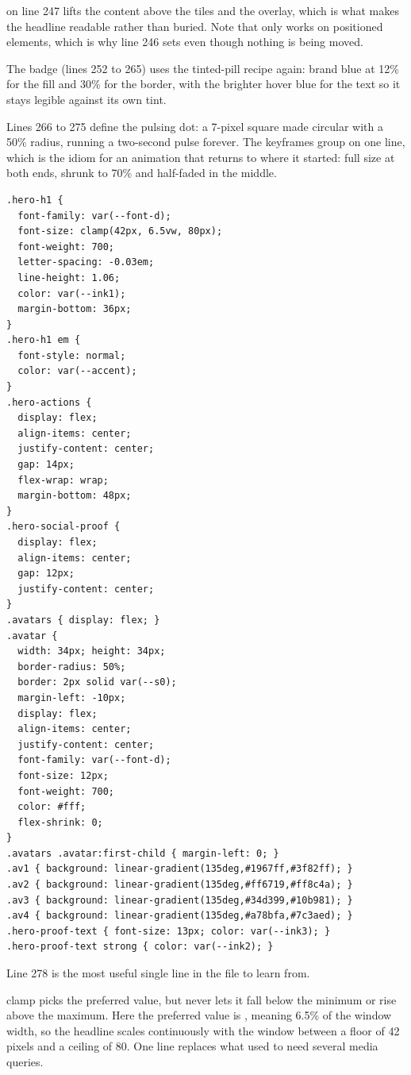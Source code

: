 on line 247 lifts the content above the tiles and the overlay,
which is what makes the headline readable rather than buried. Note that
 only works on positioned elements, which is why line 246 sets
 even though nothing is being moved.

The badge (lines 252 to 265) uses the tinted-pill recipe again: brand blue at 12\%
for the fill and 30\% for the border, with the brighter hover blue for the text so
it stays legible against its own tint.

Lines 266 to 275 define the pulsing dot: a 7-pixel square made circular with a 50\%
radius, running a two-second pulse forever. The keyframes group 
on one line, which is the idiom for an animation that returns to where it started:
full size at both ends, shrunk to 70\% and half-faded in the middle.

\begin{lstlisting}[firstnumber=276,caption={\file{css/site.css}, lines 276--324}]
.hero-h1 {
  font-family: var(--font-d);
  font-size: clamp(42px, 6.5vw, 80px);
  font-weight: 700;
  letter-spacing: -0.03em;
  line-height: 1.06;
  color: var(--ink1);
  margin-bottom: 36px;
}
.hero-h1 em {
  font-style: normal;
  color: var(--accent);
}
.hero-actions {
  display: flex;
  align-items: center;
  justify-content: center;
  gap: 14px;
  flex-wrap: wrap;
  margin-bottom: 48px;
}
.hero-social-proof {
  display: flex;
  align-items: center;
  gap: 12px;
  justify-content: center;
}
.avatars { display: flex; }
.avatar {
  width: 34px; height: 34px;
  border-radius: 50%;
  border: 2px solid var(--s0);
  margin-left: -10px;
  display: flex;
  align-items: center;
  justify-content: center;
  font-family: var(--font-d);
  font-size: 12px;
  font-weight: 700;
  color: #fff;
  flex-shrink: 0;
}
.avatars .avatar:first-child { margin-left: 0; }
.av1 { background: linear-gradient(135deg,#1967ff,#3f82ff); }
.av2 { background: linear-gradient(135deg,#ff6719,#ff8c4a); }
.av3 { background: linear-gradient(135deg,#34d399,#10b981); }
.av4 { background: linear-gradient(135deg,#a78bfa,#7c3aed); }
.hero-proof-text { font-size: 13px; color: var(--ink3); }
.hero-proof-text strong { color: var(--ink2); }
\end{lstlisting}

Line 278 is the most useful single line in the file to learn from.

\begin{jargon}{clamp}
 picks the preferred value, but never lets
it fall below the minimum or rise above the maximum. Here the preferred value is
, meaning 6.5\% of the window width, so the headline scales
continuously with the window between a floor of 42 pixels and a ceiling of 80. One
line replaces what used to need several media queries.
\end{jargon}

